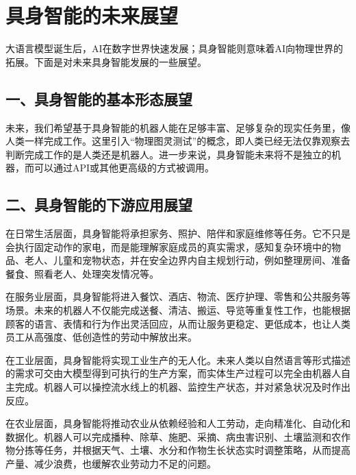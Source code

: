 \clearpage

\hypertarget{ux5177ux8eabux667aux80fdux7684ux672aux6765ux5c55ux671b}{%
\section{具身智能的未来展望}\label{ux5177ux8eabux667aux80fdux7684ux672aux6765ux5c55ux671b}}

大语言模型诞生后，AI在数字世界快速发展；具身智能则意味着AI向物理世界的拓展。下面是对未来具身智能发展的一些展望。

\hypertarget{ux4e00ux5177ux8eabux667aux80fdux7684ux57faux672cux5f62ux6001ux5c55ux671b}{%
\subsection{一、具身智能的基本形态展望}\label{ux4e00ux5177ux8eabux667aux80fdux7684ux57faux672cux5f62ux6001ux5c55ux671b}}

未来，我们希望基于具身智能的机器人能在足够丰富、足够复杂的现实任务里，像人类一样完成工作。这里引入``物理图灵测试''的概念，即人类已经无法仅靠观察去判断完成工作的是人类还是机器人。进一步来说，具身智能未来将不是独立的机器，而可以通过API或其他更高级的方式被调用。

\hypertarget{ux4e8cux5177ux8eabux667aux80fdux7684ux4e0bux6e38ux5e94ux7528ux5c55ux671b}{%
\subsection{二、具身智能的下游应用展望}\label{ux4e8cux5177ux8eabux667aux80fdux7684ux4e0bux6e38ux5e94ux7528ux5c55ux671b}}

在日常生活层面，具身智能将承担家务、照护、陪伴和家庭维修等任务。它不只是会执行固定动作的家电，而是能理解家庭成员的真实需求，感知复杂环境中的物品、老人、儿童和宠物状态，并在安全边界内自主规划行动，例如整理房间、准备餐食、照看老人、处理突发情况等。

在服务业层面，具身智能将进入餐饮、酒店、物流、医疗护理、零售和公共服务等场景。未来的机器人不仅能完成送餐、清洁、搬运、导览等重复性工作，也能根据顾客的语言、表情和行为作出灵活回应，从而让服务更稳定、更低成本，也让人类员工从高强度、低创造性的劳动中解放出来。

在工业层面，具身智能将实现工业生产的无人化。未来人类以自然语言等形式描述的需求可交由大模型得到可执行的生产方案，而实体生产过程可以完全由机器人自主完成。机器人可以操控流水线上的机器、监控生产状态，并对紧急状况及时作出反应。

在农业层面，具身智能将推动农业从依赖经验和人工劳动，走向精准化、自动化和数据化。机器人可以完成播种、除草、施肥、采摘、病虫害识别、土壤监测和农作物分拣等任务，并根据天气、土壤、水分和作物生长状态实时调整策略，从而提高产量、减少浪费，也缓解农业劳动力不足的问题。

